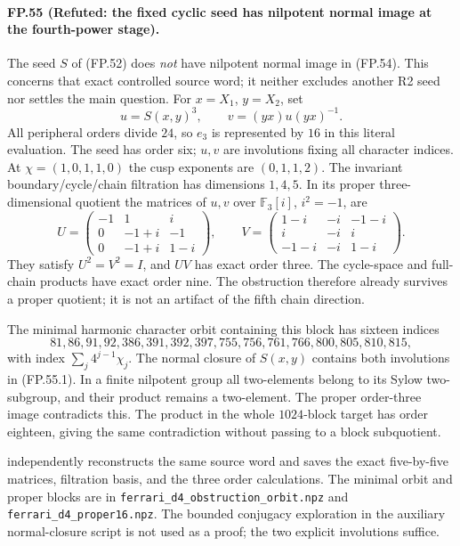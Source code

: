 \paragraph{FP.55 (Refuted: the fixed cyclic seed has nilpotent normal image at the fourth-power stage).}
The seed $S$ of (FP.52) does \emph{not} have nilpotent normal image
in (FP.54). This concerns that exact controlled source word;
it neither excludes another R2 seed nor settles the main question.
For $x=X_1$, $y=X_2$, set
\[
              u=S(x,y)^3,\qquad v=(yx)u(yx)^{-1}.
 \tag{FP.55.1}
\]
All peripheral orders divide $24$, so $e_3$ is represented by
$16$ in this literal evaluation. The seed has order six; $u,v$
are involutions fixing all character indices. At
$\chi=(1,0,1,1,0)$ the cusp exponents are $(0,1,1,2)$.
The invariant boundary/cycle/chain filtration has dimensions
$1,4,5$. In its proper three-dimensional quotient the matrices
of $u,v$ over $\mathbb F_3[i]$, $i^2=-1$, are
\[
 U=\begin{pmatrix}-1&1&i\\0&-1+i&-1\\0&-1+i&1-i\end{pmatrix},\qquad
 V=\begin{pmatrix}1-i&-i&-1-i\\i&-i&i\\-1-i&-i&1-i\end{pmatrix}.
 \tag{FP.55.2}
\]
They satisfy $U^2=V^2=I$, and $UV$ has exact order three.
The cycle-space and full-chain products have exact order nine.
The obstruction therefore already survives a proper quotient;
it is not an artifact of the fifth chain direction.

The minimal harmonic character orbit containing this block has
sixteen indices
\[
81,86,91,92,386,391,392,397,755,756,761,766,800,805,810,815,
\]
with index $\sum_j4^{j-1}\chi_j$.
The normal closure of $S(x,y)$ contains both involutions in
(FP.55.1). In a finite nilpotent group all two-elements belong
to its Sylow two-subgroup, and their product remains a two-element.
The proper order-three image contradicts this. The product in
the whole $1024$-block target has order eighteen, giving the same
contradiction without passing to a block subquotient.

 independently reconstructs
the same source word and saves the exact five-by-five matrices,
filtration basis, and the three order calculations.
The minimal orbit and proper blocks are in
\texttt{ferrari\_d4\_obstruction\_orbit.npz} and
\texttt{ferrari\_d4\_proper16.npz}.
The bounded conjugacy exploration in the auxiliary normal-closure
script is not used as a proof; the two explicit involutions suffice.


